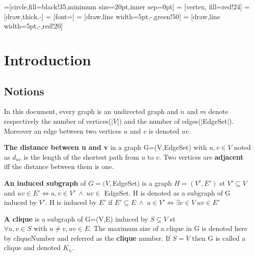 
\newcommand{\keyword}[1]{\textbf{#1}}
\newcommand{\tabhead}[1]{\textbf{#1}}
\newcommand{\code}[1]{\texttt{#1}}
\newcommand{\file}[1]{\texttt{\bfseries#1}}
\newcommand{\option}[1]{\texttt{\itshape#1}}


=[circle,fill=black!35,minimum size=20pt,inner sep=0pt]
 = [vertex, fill=red!24]
 = [draw,thick,-]
 = [font=\small]
 = [draw,line width=5pt,-,green!50]
 = [draw,line width=5pt,-,red!20]


\chapter{Introduction}
\label{sec:introduction}
\section{Notions}

In this document, every graph is an undirected graph and $n$ and $m$ denote respectively the number of vertices($|V|$) and the number of edges($|$\gls{EdgeSet}$|$). Moreover an edge between two vertices $u$ and $v$ is denoted $uv$.


\begin{mydef}
\label{def:distance}
\keyword{The distance between u and v} in a graph G=(V,\gls{EdgeSet}) with $u,v \in V$ noted as $d_{uv}$ is the length of the shortest path from $u$ to $v$. Two vertices are \keyword{adjacent} iff the distance between them is one.
\end{mydef}

\begin{mydef}
\label{def:induceSubgraph}
\keyword{An induced subgraph} of $G = (V,$\gls{EdgeSet}$)$ is a graph $H = (V\prime,E\prime)$ \acrshort{st} $V\prime \subseteq V$ and $uv \in E\prime \iff u,v \in V\prime\ \land\ uv \in $ \gls{EdgeSet}. H is denoted as a subgraph of G induced by $V\prime$. H is induced by $E\prime$ if $E\prime \subseteq E\ \land\ u \in V\prime \iff \exists v \in V\ uv \in E\prime $
\end{mydef}

\begin{mydef}
\label{def:clique}
\keyword{A clique} is a subgraph of G=(V,E) induced by $S \subseteq V $ \acrshort{st} $\forall u,v \in S \text{ with } u \neq v, uv \in E$. The maximum size of a clique in G is denoted here by \gls{cliqueNumber}  and referred as the \textbf{clique} number. If $S=V$ then G is called a clique and denoted $K_n$.
\end{mydef}

